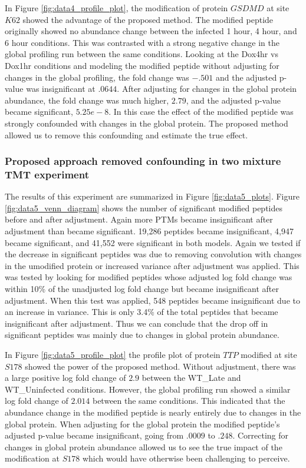 \documentclass[mcp]{article}
\numberwithin{table}{section}
\begin{document}
In Figure \ref{fig:data4_profile_plot}, the modification of protein $GSDMD$ at site $K62$ showed the advantage of the proposed method. The modified peptide originally showed no abundance change between the infected 1 hour, 4 hour, and 6 hour conditions. This was contrasted with a strong negative change in the global profiling run between the same conditions. Looking at the Dox4hr vs Dox1hr conditions and modeling the modified peptide without adjusting for changes in the global profiling, the fold change was $-.501$ and the adjusted p-value was insignificant at $.0644$. After adjusting for changes in the global protein abundance, the fold change was much higher, $2.79$, and the adjusted p-value became significant, $5.25e-8$. In this case the effect of the modified peptide was strongly confounded with changes in the global protein. The proposed method allowed us to remove this confounding and estimate the true effect.

\subsubsection*{Proposed approach removed confounding in two mixture TMT experiment}

The results of this experiment are summarized in Figure \ref{fig:data5_plots}. Figure \ref{fig:data5_venn_diagram} shows the number of significant modified peptides before and after adjustment. Again more PTMs became insignificant after adjustment than became significant. 19,286 peptides became insignificant, 4,947 became significant, and 41,552 were significant in both models. Again we tested if the decrease in significant peptides was due to removing convolution with changes in the umodified protein or increased variance after adjustment was applied. This was tested by looking for modified peptides whose adjusted log fold change was within 10\% of the unadjusted log fold change but became insignificant after adjustment. When this test was applied, 548 peptides became insignificant due to an increase in variance. This is only 3.4\% of the total peptides that became insignificant after adjustment. Thus we can conclude that the drop off in significant peptides was mainly due to changes in global protein abundance.

In Figure \ref{fig:data5_profile_plot} the profile plot of protein $TTP$ modified at site $S178$ showed the power of the proposed method. Without adjustment, there was a large positive log fold change of $2.9$ between the WT\_Late and WT\_Uninfected conditions. However, the global profiling run showed a similar log fold change of $2.014$ between the same conditions. This indicated that the abundance change in the modified peptide is nearly entirely due to changes in the global protein. When adjusting for the global protein the modified peptide's adjusted p-value became insignificant, going from $.0009$ to $.248$. Correcting for changes in global protein abundance allowed us to see the true impact of the modification at $S178$ which would have otherwise been challenging to perceive.
\end{document}
